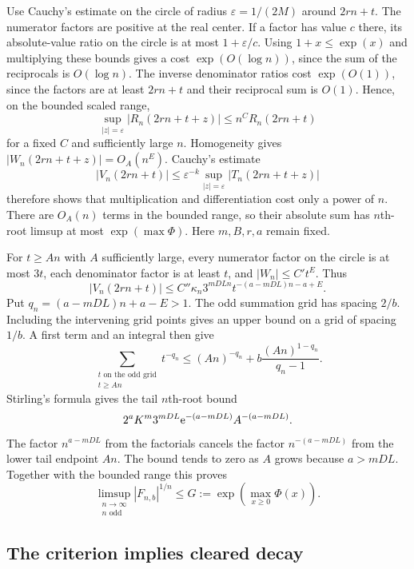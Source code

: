 Use Cauchy's estimate on the circle of radius
$\varepsilon=1/(2M)$ around $2rn+t$. The numerator factors
are positive at the real center. If a factor has value $c$
there, its absolute-value ratio on the circle is at most
$1+\varepsilon/c$. Using $1+x\le\exp(x)$ and multiplying
these bounds gives a cost $\exp(O(\log n))$, since the sum of
the reciprocals is $O(\log n)$. The inverse denominator ratios cost
$\exp(O(1))$, since the factors are at least $2rn+t$ and their
reciprocal sum is $O(1)$. Hence, on the bounded scaled range,
\[
 \sup_{|z|=\varepsilon}|R_n(2rn+t+z)|
                    \le n^C R_n(2rn+t)
\]
for a fixed $C$ and sufficiently large $n$.
Homogeneity gives $|W_n(2rn+t+z)|=O_A(n^E)$.
Cauchy's estimate
\[
 |V_n(2rn+t)|\le\varepsilon^{-k}
                  \sup_{|z|=\varepsilon}|T_n(2rn+t+z)|
\]
therefore shows that multiplication and differentiation cost
only a power of $n$. There are $O_A(n)$ terms in the bounded
range, so their absolute sum has $n$th-root limsup at most
$\exp(\max\Phi)$. Here $m,B,r,a$ remain fixed.

For $t\ge An$ with $A$ sufficiently large, every numerator
factor on the circle is at most $3t$, each denominator factor
is at least $t$, and $|W_n|\le C't^E$. Thus
\[
 |V_n(2rn+t)|\le C''\kappa_n3^{mDLn}
                         t^{-(a-mDL)n-a+E}.
\]
Put $q_n=(a-mDL)n+a-E>1$. The odd summation grid has spacing
$2/b$. Including the intervening grid points gives an upper bound
on a grid of spacing $1/b$. A first term and an integral then give
\[
 \sum_{\substack{t\text{ on the odd grid}\\t\ge An}}t^{-q_n}
 \le(An)^{-q_n}+b\frac{(An)^{1-q_n}}{q_n-1}.
\]
Stirling's formula gives the tail $n$th-root bound
\[
 2^aK^m3^{mDL}\mathrm e^{-(a-mDL)}A^{-(a-mDL)}.
\]
The factor $n^{a-mDL}$ from the factorials cancels the factor
$n^{-(a-mDL)}$ from the lower tail endpoint $An$. The bound tends
to zero as $A$ grows because $a>mDL$.
Together with the bounded range this proves
\begin{equation}\label{eq:uncleared-decay}
 \limsup_{\substack{n\to\infty\\n\text{ odd}}}|F_{n,b}|^{1/n}
       \le G:=\exp\!\left(\max_{x\ge0}\Phi(x)\right).
\end{equation}

\subsection{The criterion implies cleared decay}

